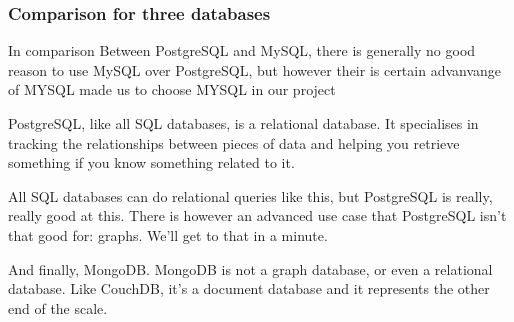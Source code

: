 \subsubsection{Comparison for three databases}
In comparison  Between PostgreSQL and MySQL, there is generally no good reason to use MySQL over PostgreSQL, but however their is certain advanvange of MYSQL made us to choose MYSQL in our project 

PostgreSQL, like all SQL databases, is a relational database. It specialises in tracking the relationships between pieces of data and helping you retrieve something if you know something related to it.

All SQL databases can do relational queries like this, but PostgreSQL is really, really good at this. There is however an advanced use case that PostgreSQL isn't that good for: graphs. We'll get to that in a minute.


And finally, MongoDB. MongoDB is not a graph database, or even a relational database. Like CouchDB, it's a document database and it represents the other end of the scale. 

